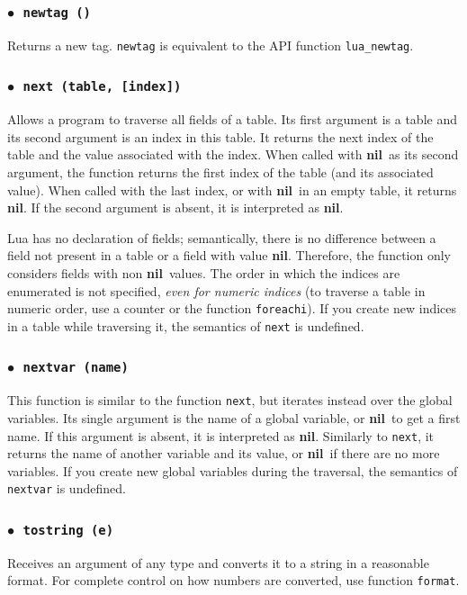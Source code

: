 \documentclass[11pt]{article}
\newcommand{\T}[1]{{\tt #1}}
\newcommand{\nil}{{\bf nil}}
\newcommand{\Deffunc}[1]{\index{#1}}
\newcommand{\ff}{$\bullet$\ }
\begin{document}
\subsubsection*{\ff \T{newtag ()}}\Deffunc{newtag}\label{pdf-newtag}
Returns a new tag.
\verb|newtag| is equivalent to the API function \verb|lua_newtag|.

\subsubsection*{\ff \T{next (table, [index])}}\Deffunc{next}
Allows a program to traverse all fields of a table.
Its first argument is a table and its second argument
is an index in this table.
It returns the next index of the table and the
value associated with the index.
When called with \nil\ as its second argument,
the function returns the first index
of the table (and its associated value).
When called with the last index,
or with \nil\ in an empty table,
it returns \nil.
If the second argument is absent, it is interpreted as \nil.

Lua has no declaration of fields;
semantically, there is no difference between a
field not present in a table or a field with value \nil.
Therefore, the function only considers fields with non \nil\ values.
The order in which the indices are enumerated is not specified,
\emph{even for numeric indices}
(to traverse a table in numeric order,
use a counter or the function \verb|foreachi|).
If you create new indices in a table while
traversing it,
the semantics of \verb|next| is undefined.

\subsubsection*{\ff \T{nextvar (name)}}\Deffunc{nextvar}
This function is similar to the function \verb|next|,
but iterates instead over the global variables.
Its single argument is the name of a global variable,
or \nil\ to get a first name.
If this argument is absent, it is interpreted as \nil.
Similarly to \verb|next|, it returns the name of another variable
and its value,
or \nil\ if there are no more variables.
If you create new global variables during the traversal,
the semantics of \verb|nextvar| is undefined.

\subsubsection*{\ff \T{tostring (e)}}\Deffunc{tostring}
Receives an argument of any type and
converts it to a string in a reasonable format.
For complete control on how numbers are converted,
use function \verb|format|.
\end{document}
